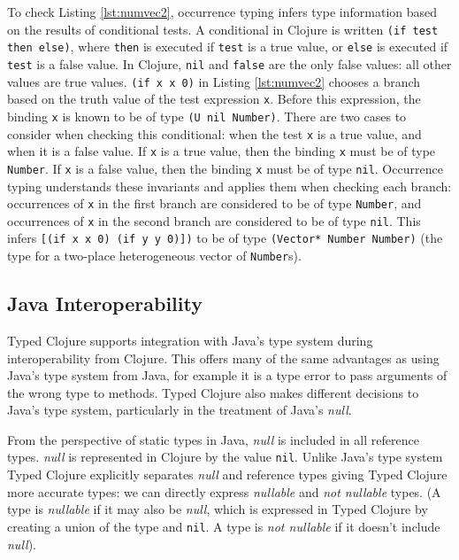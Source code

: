 To check Listing \ref{lst:numvec2}, occurrence typing infers type information based on the results of conditional tests.
A conditional in Clojure is written \lstinline|(if test then else)|, where \lstinline|then|
is executed if \lstinline|test| is a true value, or \lstinline|else| is executed if \lstinline|test|
is a false value.
In Clojure, \lstinline|nil| and \lstinline|false| are the only false values: all other values are true values.
\lstinline|(if x x 0)| in Listing \ref{lst:numvec2} chooses a branch based on the truth value of the test expression \lstinline|x|.
Before this expression, the binding \lstinline|x| is known to be of type \lstinline|(U nil Number)|.
There are two cases to consider when checking this conditional: when the test \lstinline|x| is a true value, and when it is a false value.
If \lstinline|x| is a true value, then the binding \lstinline|x| must be of type \lstinline|Number|.
If \lstinline|x| is a false value, then the binding \lstinline|x| must be of type \lstinline|nil|.
Occurrence typing understands these invariants and applies them when checking each branch:
occurrences of \lstinline|x| in the first branch are considered to be of type \lstinline|Number|, and
occurrences of \lstinline|x| in the second branch are considered to be of type \lstinline|nil|.
This infers \lstinline|[(if x x 0) (if y y 0)])| to be of type
\lstinline|(Vector* Number Number)| (the type for a two-place heterogeneous vector of \lstinline|Number|s).

\subsection{Java Interoperability}
\label{sec:javainterop}

Typed Clojure supports integration with Java's type system during
interoperability from Clojure. This offers many of the same advantages
as using Java's type system from Java, for example it is a type
error to pass arguments of the wrong type to methods.
Typed Clojure also makes different decisions to Java's type system,
particularly in the treatment of Java's \emph{null}.

From the perspective of static types in Java, \emph{null} is included in all reference types.
\emph{null} is represented in Clojure by the value \lstinline|nil|. Unlike Java's type system
Typed Clojure explicitly separates \emph{null} and reference types giving Typed Clojure 
more accurate types: we can directly express \emph{nullable} and \emph{not nullable} types.
(A type is \emph{nullable} if it may also be \emph{null},
which is expressed in Typed Clojure by creating a union of the type and \lstinline|nil|.
A type is \emph{not nullable} if it doesn't include \emph{null}).

